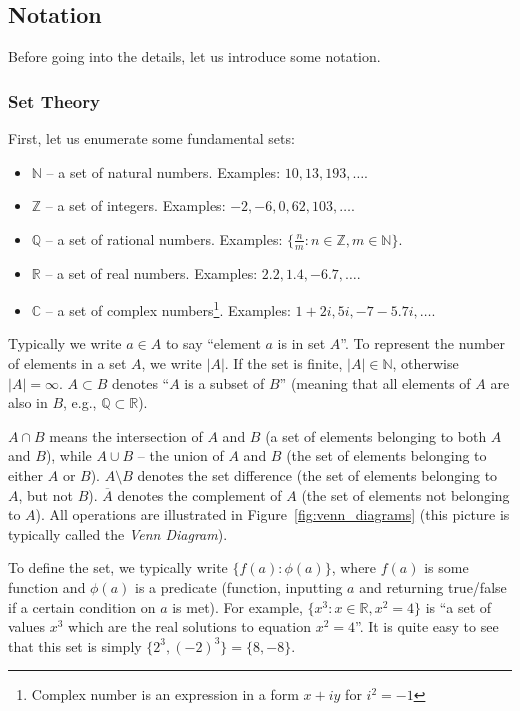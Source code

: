 \documentclass[../lecture-notes.tex]{subfiles}
\begin{document}
\subsection{Notation}

Before going into the details, let us introduce some notation.

\subsubsection{Set Theory}
First, let us enumerate some fundamental sets:
\begin{itemize}
    \item $\mathbb{N}$ -- a set of natural numbers. Examples: $10, 13, 193, \dots$.
    \item $\mathbb{Z}$ -- a set of integers. Examples: $-2, -6, 0, 62, 103, \dots$.
    \item $\mathbb{Q}$ -- a set of rational numbers. Examples: $\{\frac{n}{m}: n \in \mathbb{Z}, m \in \mathbb{N}\}$.
    \item $\mathbb{R}$ -- a set of real numbers. Examples: $2.2, 1.4, -6.7, \dots$.
    \item $\mathbb{C}$ -- a set of complex numbers\footnote{Complex number is an expression in a form $x+iy$ for $i^2=-1$}. Examples: $1+2i, 5i, -7-5.7i, \dots$.
\end{itemize}

Typically we write $a \in A$ to say ``element $a$ is in set $A$''. To represent the number of elements in a set $A$, we write $|A|$. If the set is finite, $|A| \in \mathbb{N}$, otherwise 
$|A| = \infty$. $A \subset B$ denotes ``$A$ is a subset of $B$'' (meaning that all elements of $A$ are also in $B$, e.g., $\mathbb{Q} \subset \mathbb{R}$).

$A \cap B$ means the intersection of $A$ and $B$ (a set of elements belonging to both $A$ and $B$), while $A \cup B$ -- the union of $A$ and $B$ (the set of elements belonging to either $A$ or $B$). $A \setminus B$ denotes the set difference (the set of elements belonging to $A$, but not $B$). $\overline{A}$ denotes the complement of $A$ (the set of elements not belonging to $A$). All operations are illustrated in Figure~\ref{fig:venn_diagrams} (this picture is typically called the \textit{Venn Diagram}).

To define the set, we typically write $\{f(a): \phi(a)\}$, where $f(a)$ is some function and $\phi(a)$ is a predicate (function, inputting $a$ and returning true/false if a certain condition on $a$ is met). For example, $\{x^3: x \in \mathbb{R}, x^2 = 4\}$ is ``a set of values $x^3$ which are the real solutions to equation $x^2 = 4$''. It is quite easy to see that this set is simply $\{2^3, (-2)^3\} = \{8,-8\}$. 
\end{document}
